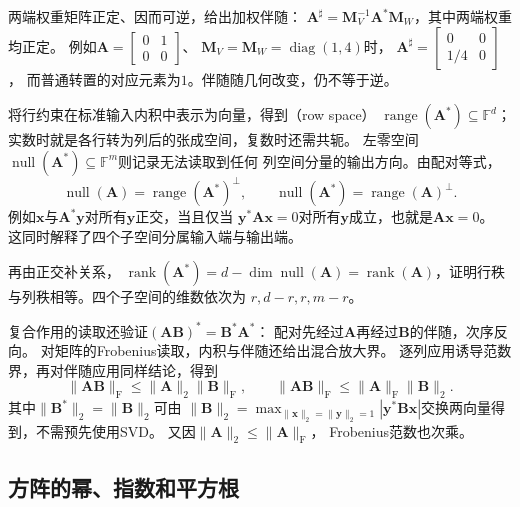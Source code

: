 两端权重矩阵正定、因而可逆，给出加权伴随：
$\bm A^\sharp=\bm M_V^{-1}\bm A^*\bm M_W$，其中两端权重均正定。
例如$\bm A=\left[\begin{smallmatrix}0&1\\0&0\end{smallmatrix}\right]$、
$\bm M_V=\bm M_W=\operatorname{diag}(1,4)$时，
$\bm A^\sharp=\left[\begin{smallmatrix}0&0\\1/4&0\end{smallmatrix}\right]$，
而普通转置的对应元素为$1$。伴随随几何改变，仍不等于逆。


将行约束在标准输入内积中表示为向量，得到（row space）
$\operatorname{range}(\bm A^*)\subseteq\mathbb F^d$；
实数时就是各行转为列后的张成空间，复数时还需共轭。
左零空间$\operatorname{null}(\bm A^*)\subseteq\mathbb F^m$则记录无法读取到任何
列空间分量的输出方向。由配对等式，
\[
 \operatorname{null}(\bm A)=\operatorname{range}(\bm A^*)^\perp,\qquad
 \operatorname{null}(\bm A^*)=\operatorname{range}(\bm A)^\perp.
\]
例如$\bm x$与$\bm A^*\bm y$对所有$\bm y$正交，当且仅当
$\bm y^*\bm A\bm x=0$对所有$\bm y$成立，也就是$\bm A\bm x=0$。
这同时解释了四个子空间分属输入端与输出端。


再由正交补关系，
$\operatorname{rank}(\bm A^*)=d-\dim\operatorname{null}(\bm A)
=\operatorname{rank}(\bm A)$，证明行秩与列秩相等。四个子空间的维数依次为
$r,d-r,r,m-r$。


复合作用的读取还验证$(\bm A\bm B)^*=\bm B^*\bm A^*$：
配对先经过$\bm A$再经过$\bm B$的伴随，次序反向。
对矩阵的Frobenius读取，内积与伴随还给出混合放大界。
逐列应用诱导范数界，再对伴随应用同样结论，得到
\begin{equation}
 \lVert\bm A\bm B\rVert_{\mathrm F}
 \leq\lVert\bm A\rVert_2\lVert\bm B\rVert_{\mathrm F},
 \qquad
 \lVert\bm A\bm B\rVert_{\mathrm F}
 \leq\lVert\bm A\rVert_{\mathrm F}\lVert\bm B\rVert_2.
 \label{eq:matrix-analysis-mixed-submultiplicativity}
\end{equation}
其中$\lVert\bm B^*\rVert_2=\lVert\bm B\rVert_2$可由
$\lVert\bm B\rVert_2=\max_{\lVert\bm x\rVert_2=\lVert\bm y\rVert_2=1}
|\bm y^*\bm B\bm x|$交换两向量得到，不需预先使用SVD。
又因$\lVert\bm A\rVert_2\leq\lVert\bm A\rVert_{\mathrm F}$，
Frobenius范数也次乘。

\subsection{方阵的幂、指数和平方根}
\label{sec:matrix-analysis-functions-structured-operations}
\label{sec:ch06-powers-spectrum}
\label{sec:matrix-analysis-spectrum}
\label{sec:ch06-triangular-spectrum}

